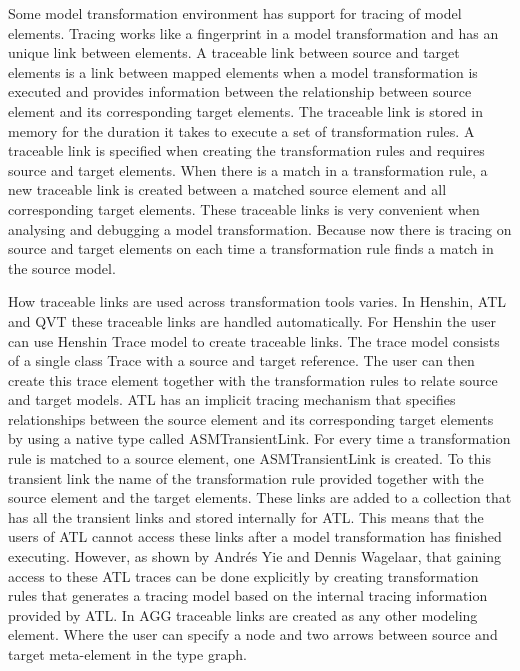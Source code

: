 Some model transformation environment has support for tracing of model
elements. Tracing works like a fingerprint in a model transformation and
has an unique link between elements. A traceable link between source and target
elements is a link between mapped elements when a model transformation is
executed and provides information between the relationship between source
element and its corresponding target elements. The traceable link is stored in
memory for the duration it takes to execute a set of transformation rules. A
traceable link is specified when creating the transformation rules and requires
source and target elements. When there is a match in a transformation rule, a
new traceable link is created between a matched source element and all
corresponding target elements. These traceable links is very convenient when
analysing and debugging a model transformation. Because now there is tracing on
source and target elements on each time a transformation rule finds a match in
the source model.

How traceable links are used across transformation tools varies. In Henshin, ATL
and QVT these traceable links are handled automatically. For Henshin the user
can use Henshin Trace model to create traceable links. The trace model consists
of a single class Trace with a source and target reference. The user can then
create this trace element together with the transformation rules to relate
source and target models. ATL has an implicit tracing mechanism that specifies
relationships between the source element and its corresponding target elements
by using a native type called ASMTransientLink\cite{Wagelaar}. For every time a
transformation rule is matched to a source element, one ASMTransientLink is
created. To this transient link the name of the transformation rule provided
together with the source element and the target elements. These links are added
to a collection that has all the transient links and stored internally for ATL.
This means that the users of ATL cannot access these links after a model
transformation has finished executing. However, as shown by Andr\'{e}s Yie and
Dennis Wagelaar\cite{Wagelaar}, that gaining access to these ATL traces can be
done explicitly by creating transformation rules that generates a tracing
model based on the internal tracing information provided by ATL. In AGG
traceable links are created as any other modeling element. Where the user can
specify a node and two arrows between source and target meta-element in the type
graph. 


